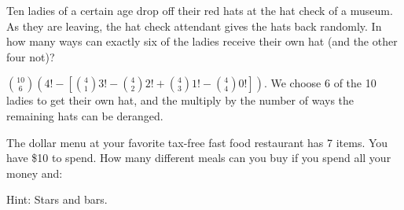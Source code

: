 \begin{questions}

	
	


\question Ten ladies of a certain age drop off their red hats at the hat check of a museum.  As they are leaving, the hat check attendant gives the hats back randomly.  In how many ways can exactly six of the ladies receive their own hat (and the other four not)?

	\begin{answer}
	${10 \choose 6}\left(4! - \left[{4 \choose 1} 3! - {4 \choose 2}2! + {4 \choose 3}1! - {4 \choose 4}0!\right]\right)$.  We choose 6 of the 10 ladies to get their own hat, and the multiply by the number of ways the remaining hats can be deranged. 
	\end{answer}
	
	
\question The dollar menu at your favorite tax-free fast food restaurant has 7 items.  You have \$10 to spend. How many different meals can you buy if you spend all your money and: 

  \begin{answer}
  Hint: Stars and bars.
  \end{answer}


\end{questions}